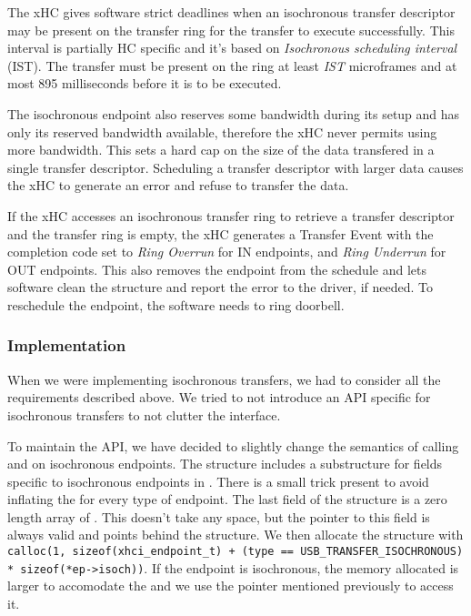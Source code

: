 The xHC gives software strict deadlines when an isochronous transfer descriptor
may be present on the transfer ring for the transfer to execute successfully.
This interval is partially HC specific and it's based on \textit{Isochronous
scheduling interval} (IST). The transfer must be present on the ring at least
\textit{IST} microframes and at most 895 milliseconds before it is to be
executed.

The isochronous endpoint also reserves some bandwidth during its setup and has
only its reserved bandwidth available, therefore the xHC never permits using
more bandwidth. This sets a hard cap on the size of the data transfered in a
single transfer descriptor. Scheduling a transfer descriptor with larger data
causes the xHC to generate an error and refuse to transfer the data.

If the xHC accesses an isochronous transfer ring to retrieve a transfer
descriptor and the transfer ring is empty, the xHC generates a Transfer Event
with the completion code set to \textit{Ring Overrun} for IN endpoints, and
\textit{Ring Underrun} for OUT endpoints. This also removes the endpoint from
the schedule and lets software clean the structure and report the error to the
driver, if needed. To reschedule the endpoint, the software needs to ring
doorbell.

\subsubsection{Implementation}

When we were implementing isochronous transfers, we had to consider all the
requirements described above. We tried to not introduce an API specific for
isochronous transfers to not clutter the interface.

To maintain the  API, we have decided to slightly change the
semantics of calling  and  on isochronous
endpoints. The  structure includes a substructure for
fields specific to isochronous endpoints in . There is a
small trick present to avoid inflating the  for every
type of endpoint. The last field of the structure is a zero length array of
. This doesn't take any space, but the pointer to this
field is always valid and points behind the structure. We then allocate the
structure with \texttt{calloc(1, sizeof(xhci_endpoint_t) + (type ==
USB_TRANSFER_ISOCHRONOUS) * sizeof(*ep->isoch))}. If the endpoint is
isochronous, the memory allocated is larger to accomodate the
 and we use the pointer mentioned previously to access it.

